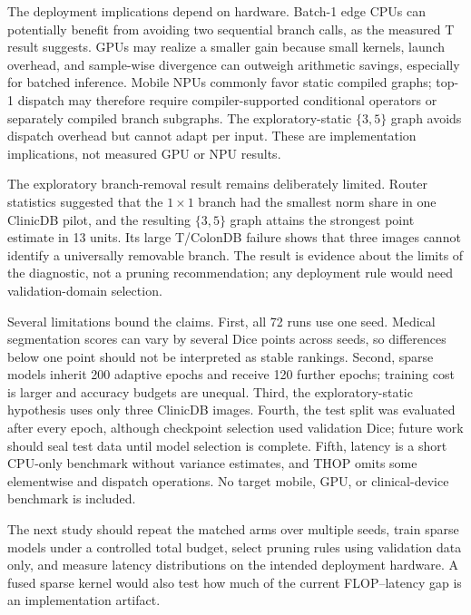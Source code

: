 \documentclass[conference]{IEEEtran}
\begin{document}
The deployment implications depend on hardware. Batch-1 edge CPUs can potentially benefit from avoiding two sequential branch calls, as the measured T result suggests. GPUs may realize a smaller gain because small kernels, launch overhead, and sample-wise divergence can outweigh arithmetic savings, especially for batched inference. Mobile NPUs commonly favor static compiled graphs; top-1 dispatch may therefore require compiler-supported conditional operators or separately compiled branch subgraphs. The exploratory-static $\{3,5\}$ graph avoids dispatch overhead but cannot adapt per input. These are implementation implications, not measured GPU or NPU results.

The exploratory branch-removal result remains deliberately limited. Router statistics suggested that the $1\times1$ branch had the smallest norm share in one ClinicDB pilot, and the resulting $\{3,5\}$ graph attains the strongest point estimate in 13 units. Its large T/ColonDB failure shows that three images cannot identify a universally removable branch. The result is evidence about the limits of the diagnostic, not a pruning recommendation; any deployment rule would need validation-domain selection.

Several limitations bound the claims. First, all 72 runs use one seed. Medical segmentation scores can vary by several Dice points across seeds, so differences below one point should not be interpreted as stable rankings. Second, sparse models inherit 200 adaptive epochs and receive 120 further epochs; training cost is larger and accuracy budgets are unequal. Third, the exploratory-static hypothesis uses only three ClinicDB images. Fourth, the test split was evaluated after every epoch, although checkpoint selection used validation Dice; future work should seal test data until model selection is complete. Fifth, latency is a short CPU-only benchmark without variance estimates, and THOP omits some elementwise and dispatch operations. No target mobile, GPU, or clinical-device benchmark is included.

The next study should repeat the matched arms over multiple seeds, train sparse models under a controlled total budget, select pruning rules using validation data only, and measure latency distributions on the intended deployment hardware. A fused sparse kernel would also test how much of the current FLOP--latency gap is an implementation artifact.
\end{document}
